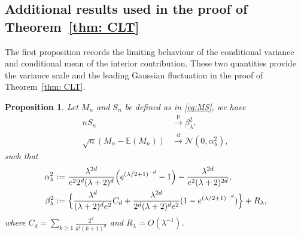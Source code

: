 \documentclass[11pt]{article}
\newtheorem{prop}[thm]{Proposition}
\newcommand{\vol}{\mathrm{vol}}
\newcommand{\pto}{\xrightarrow{\,\mathrm{p}\,} }
\newcommand{\dto}{\xrightarrow{\,\mathrm{d}\,} }
\begin{document}
\subsection{Additional results used in the proof of Theorem~\ref{thm: CLT}}

The first proposition records the limiting behaviour of the conditional variance and conditional mean of the interior contribution. These two quantities provide the variance scale and the leading Gaussian fluctuation in the proof of Theorem~\ref{thm: CLT}.

\begin{prop}
\label{Prop:AsymptoticMeanVariance}
Let $M_n$ and $S_n$ be defined as in \eqref{eq:MS}, we have 
\begin{align*}
nS_n &\pto \beta_\lambda^2,\\
\sqrt{n} (M_n - \mathbb{E}(M_n)) &\dto \mathcal{N}(0,\alpha_\lambda^2),
\end{align*}
such that 
\begin{align}
    \alpha^2_\lambda &:= \frac{\lambda^{2d}}{e^2 2^d(\lambda+2)^d}\Bigl(e^{(\lambda/2+1)^{-d}} - 1\Bigr) -\frac{\lambda^{2d}}{e^2(\lambda+2)^{2d}}, \label{eq:alpha}\\
	    \beta^2_\lambda&:= \Big\{\frac{\lambda^d}{ (\lambda + 2)^de^{2}}C_d + \frac{\lambda^{2d}}{2^{d}(\lambda + 2)^de^2}(1 - e^{(\lambda/2 + 1)^{-d}})\Big\} + R_\lambda,\label{eq:beta}
	\end{align}
	where $C_d = \sum_{k\geq 1}\frac{2^d}{k!(k + 1)^d}$ and $R_\lambda=O(\lambda^{-1})$.
\end{prop}
\end{document}
